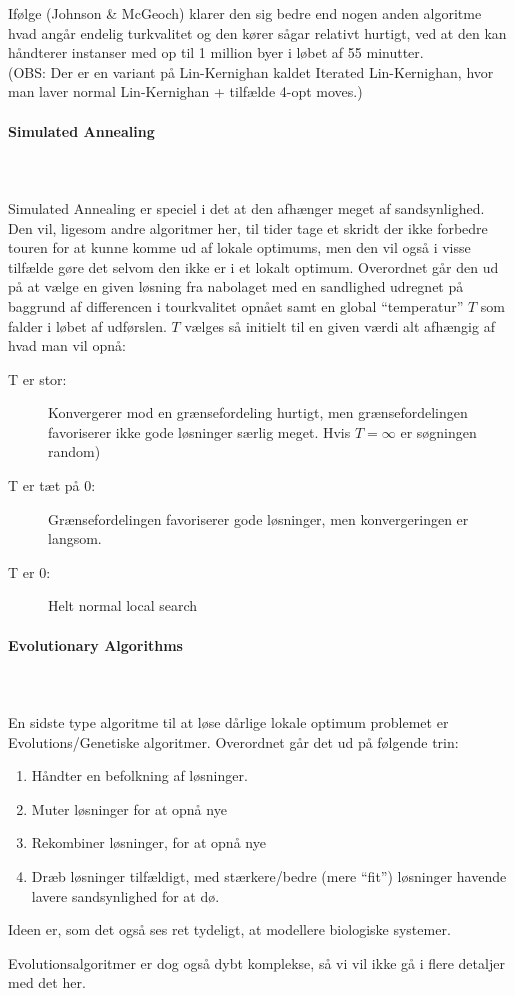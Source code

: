Ifølge (Johnson \& McGeoch) klarer den sig bedre end nogen anden algoritme hvad angår endelig turkvalitet og den kører sågar relativt hurtigt, ved at den kan håndterer instanser med op til 1 million byer i løbet af 55 minutter.\\

(OBS: Der er en variant på Lin-Kernighan kaldet Iterated Lin-Kernighan, hvor man laver normal Lin-Kernighan + tilfælde 4-opt moves.) 


\paragraph{Simulated Annealing}
~\\
~\\
Simulated Annealing er speciel i det at den afhænger meget af sandsynlighed. Den vil, ligesom andre algoritmer her, til tider tage et skridt der ikke forbedre touren for at kunne komme ud af lokale optimums, men den vil også i visse tilfælde gøre det selvom den ikke er i et lokalt optimum. Overordnet går den ud på at vælge en given løsning fra nabolaget med en sandlighed udregnet på baggrund af differencen i tourkvalitet opnået samt en global ``temperatur'' $T$ som falder i løbet af udførslen. $T$ vælges så initielt til en given værdi alt afhængig af hvad man vil opnå:
\begin{description}
 \item[T er stor:] Konvergerer mod en grænsefordeling hurtigt, men grænsefordelingen favoriserer ikke gode løsninger særlig meget. Hvis $T=\infty$ er søgningen random)
 \item[T er tæt på 0:] Grænsefordelingen favoriserer gode løsninger, men konvergeringen er langsom.
 \item[T er 0:] Helt normal local search
\end{description}


\paragraph{Evolutionary Algorithms}
~\\
~\\
En sidste type algoritme til at løse dårlige lokale optimum problemet er Evolutions/Genetiske algoritmer. Overordnet går det ud på følgende trin:
\begin{enumerate}
 \item Håndter en befolkning af løsninger.
 \item Muter løsninger for at opnå nye
 \item Rekombiner løsninger, for at opnå nye
 \item Dræb løsninger tilfældigt, med stærkere/bedre (mere ``fit'') løsninger havende lavere sandsynlighed for at dø.
\end{enumerate}
Ideen er, som det også ses ret tydeligt, at modellere biologiske systemer. 

Evolutionsalgoritmer er dog også dybt komplekse, så vi vil ikke gå i flere detaljer med det her.







